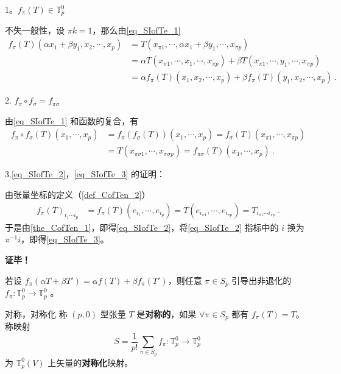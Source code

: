 1。$f_\pi(T)\in\mathbb{T}_p^0$

不失一般性，设 $\pi k=1$，那么由\autoref{eq_SIofTe_1} 
\begin{equation}
\begin{aligned}
f_\pi(T)(\alpha x_1+\beta y_1,x_2,\cdots,x_p)&=T(x_{\pi1},\cdots,\alpha x_1+\beta y_1,\cdots,x_{\pi p})\\
&=\alpha T(x_{\pi1},\cdots,x_1,\cdots,x_{\pi p})+\beta T(x_{\pi1},\cdots,y_1,\cdots,x_{\pi p})\\
&=\alpha f_{\pi}(T)(x_1,x_2,\cdots,x_p)+\beta f_{\pi}(T)(y_1,x_2,\cdots,x_p)~.
\end{aligned}
\end{equation}

2. $f_\pi \circ f_\sigma=f_{\pi\sigma}$

由\autoref{eq_SIofTe_1} 和函数的复合，有
\begin{equation}
\begin{aligned}
f_\pi\circ f_\sigma(T)(x_1,\cdots,x_p)&=f_\pi(f_\sigma(T))(x_{1},\cdots,x_{p})=f_\sigma(T)(x_{\pi1},\cdots,x_{\pi p})\\
&=T(x_{\pi\sigma1},\cdots,x_{\pi\sigma p})=f_{\pi\sigma}(T)(x_1,\cdots,x_p)~.
\end{aligned}
\end{equation}


3.\autoref{eq_SIofTe_2}，\autoref{eq_SIofTe_3} 的证明：

由张量坐标的定义（\autoref{def_CofTen_2}）
\begin{equation}
\begin{aligned}
f_{\pi}(T)_{i_1\cdots i_p}&=f_{\pi}(T)(e_{i_1},\cdots,e_{i_p})=T(e_{i_{\pi1}},\cdots,e_{i_{\pi p}})=T_{i_{\pi1}\cdots i_{\pi p}}~.
\end{aligned}
\end{equation}
于是由\autoref{the_CofTen_1}，即得\autoref{eq_SIofTe_2}，将\autoref{eq_SIofTe_2} 指标中的 $i$ 换为  $\pi^{-1} i$，即得\autoref{eq_SIofTe_3}。

\textbf{证毕！}

若设 $f_\pi(\alpha T+\beta T')=\alpha f(T)+\beta f_\pi(T')$，则任意 $\pi \in S_p$ 引导出非退化的 $f_\pi:\mathbb{T}_p^0\rightarrow\mathbb{T}_p^0$ 。

\begin{definition}{对称，对称化}
称 $(p,0)$ 型张量 $T$ 是\textbf{对称的}，如果 $\forall \pi\in S_p$ 都有 $f_{\pi}(T)=T$。称映射 
\begin{equation}
S=\frac{1}{p!}\sum_{\pi\in S_p} f_\pi:\mathbb{T}_p^0\rightarrow\mathbb{T}_p^0~
\end{equation}
为 $\mathbb{T}_p^0(V)$ 上矢量的\textbf{对称化}映射。
\end{definition}

